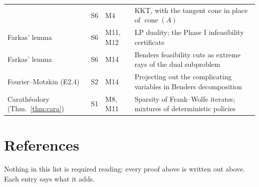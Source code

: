 \documentclass[11pt,a4paper]{article}
\theoremstyle{definition}
\theoremstyle{plain}
\theoremstyle{remark}
\DeclareMathOperator{\cone}{cone}
\begin{document}
\begin{table}[htbp]
\begin{tabular}{@{}L{4.7cm} l L{1.8cm} L{6.0cm}@{}}
  & S6 & M4
  & KKT, with the tangent cone in place of $\cone(A)$ \\
Farkas' lemma
  & S6 & M11, M12
  & LP duality; the Phase I infeasibility certificate \\
Farkas' lemma
  & S6 & M14
  & Benders feasibility cuts as extreme rays of the dual subproblem \\
Fourier--Motzkin (E2.4)
  & S2 & M14
  & Projecting out the complicating variables in Benders decomposition \\
Carath\'eodory (Thm.~\ref{thm:cara})
  & S1 & M8, M11
  & Sparsity of Frank--Wolfe iterates; mixtures of deterministic policies \\
\bottomrule
\end{tabular}
\end{table}

\section{References}

Nothing in this list is required reading: every proof above is written out above. Each entry
says what it adds.
\end{document}
